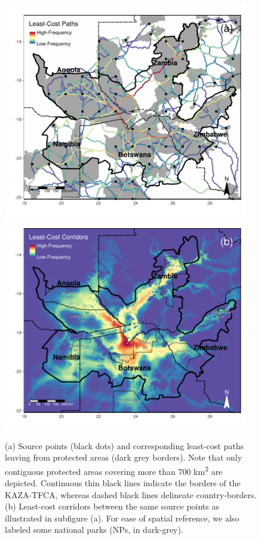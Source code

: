\documentclass[abstract=on,10pt,a4paper,bibliography=totocnumbered]{article}
\begin{document}
\begin{figure}[hbtp]
  \begin{center}
    \begin{minipage}{0.95\textwidth}
      \includegraphics[width = 0.95\textwidth]{99_LeastCostPaths.pdf}
      \includegraphics[width = 0.95\textwidth]{99_LeastCostCorrs.pdf}
    \end{minipage}
    \caption{(a) Source points (black dots) and corresponding least-cost paths
    leaving from protected areas (dark grey borders). Note that only contiguous
    protected areas covering more than 700 km\textsuperscript{2} are depicted.
    Continuous thin black lines indicate the borders of the KAZA-TFCA, whereas
    dashed black lines delineate country-borders. (b) Least-cost corridors
    between the same source points as illustrated in subfigure (a). For ease of
    spatial reference, we also labeled some national parks (NPs, in dark-grey).}
    \label{LeastCost}
  \end{center}
\end{figure}
\end{document}
